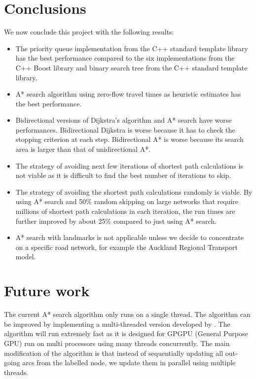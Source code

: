 \section{Conclusions}
We now conclude this project with the following results:
\begin{itemize}
    \item The priority queue implementation from the C++ standard template library has the best performance compared to the six implementations from the C++ Boost library and binary search tree from the C++ standard template library.
    \item A* search algorithm using zero-flow travel times as heuristic estimates has the best performance.
    \item Bidirectional versions of Dijkstra's algorithm and A* search have worse performances. Bidirectional Dijkstra is worse because it has to check the stopping criterion at each step. Bidirectional A* is worse because its search area is larger than that of unidirectional A*.
    \item The strategy of avoiding next few iterations of shortest path calculations is not viable as it is difficult to find the best number of iterations to skip.  
    \item The strategy of avoiding the shortest path calculations randomly is viable. By using A* search and 50\% random skipping on large networks that require millions of shortest path calculations in each iteration, the run times are further improved by about 25\% compared to just using A* search.
    \item A* search with landmarks is not applicable unless we decide to concentrate on a specific road network, for example the Auckland Regional Transport model. 
\end{itemize}

\section{Future work}
The current A* search algorithm only runs on a single thread.
The algorithm can be improved by implementing a multi-threaded version developed
by \citet{Inam}.
The algorithm will run extremely fast as it is designed for GPGPU (General Purpose GPU) run on multi processors using many threads concurrently.
The main modification of the algorithm is that  
instead of sequentially updating all out-going arcs from the labelled node,
we update them in parallel using multiple threads.

